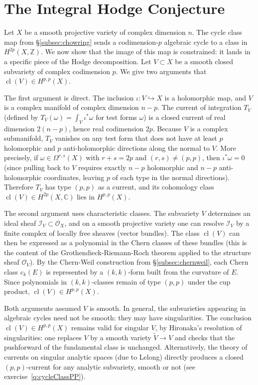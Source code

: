 \documentclass{article}
\newcommand{\C}{\mathbb{C}}
\newcommand{\Z}{{\mathbb{Z}}}
\newcommand{\CI}{\mathcal{I}}
\newcommand{\CO}{\mathcal{O}}
\newcommand{\cl}{\operatorname{cl}}
\begin{document}
\section{The Integral Hodge Conjecture}\label{sec:integral_hodge_conjecture}

Let $X$ be a smooth projective variety of complex dimension $n$. The cycle class map from
\S\ref{subsec:chowring} sends a codimension-$p$ algebraic cycle to a class in $H^{2p}(X, \Z)$. We now show
that the image of this map is constrained: it lands in a specific piece of the Hodge decomposition. Let $V
\subset X$ be a smooth closed subvariety of complex codimension $p$. We give two arguments that $\cl(V) \in
H^{p,p}(X)$.

The first argument is direct. The inclusion $\iota: V \hookrightarrow X$ is a
holomorphic map, and $V$ is a complex manifold of complex dimension $n - p$.
The current of integration $T_V$ (defined by
$T_V(\omega) = \int_V \iota^*\omega$ for test forms $\omega$) is a closed
current of real dimension $2(n-p)$, hence real codimension $2p$. Because $V$
is a complex submanifold, $T_V$ vanishes on any test form that does not have
at least $p$ holomorphic and $p$ anti-holomorphic directions along the normal
to $V$. More precisely, if $\omega \in \Omega^{r,s}(X)$ with $r + s = 2p$ and
$(r,s) \neq (p,p)$, then $\iota^*\omega = 0$ (since pulling back to $V$
requires exactly $n-p$ holomorphic and $n-p$ anti-holomorphic coordinates,
leaving $p$ of each type in the normal directions). Therefore $T_V$ has type
$(p,p)$ as a current, and its cohomology class $\cl(V) \in H^{2p}(X, \C)$
lies in $H^{p,p}(X)$.

The second argument uses characteristic classes. The subvariety $V$ determines
an ideal sheaf $\CI_V \subset \CO_X$, and on a smooth projective variety one
can resolve $\CI_V$ by a finite complex of locally free sheaves (vector
bundles). The class $\cl(V)$ can then be expressed as a polynomial in the Chern
classes of these bundles (this is the content of the Grothendieck-Riemann-Roch
theorem applied to the structure sheaf $\CO_V$). By the Chern-Weil
construction from \S\ref{subsec:chernweil}, each Chern class $c_k(E)$ is
represented by a $(k,k)$-form built from the curvature of $E$. Since
polynomials in $(k,k)$-classes remain of type $(p,p)$ under the cup product,
$\cl(V) \in H^{p,p}(X)$.

Both arguments assumed $V$ is smooth. In general, the subvarieties appearing in
algebraic cycles need not be smooth: they may have singularities. The conclusion
$\cl(V) \in H^{p,p}(X)$ remains valid for singular $V$, by Hironaka's
resolution of singularities: one replaces $V$ by a smooth variety
$\tilde{V} \to V$ and checks that the pushforward of the fundamental class is
unchanged. Alternatively, the theory of currents on singular analytic spaces
(due to Lelong) directly produces a closed $(p,p)$-current for any analytic
subvariety, smooth or not
(see exercise~\ref{q:cycleClassPP}).
\end{document}
